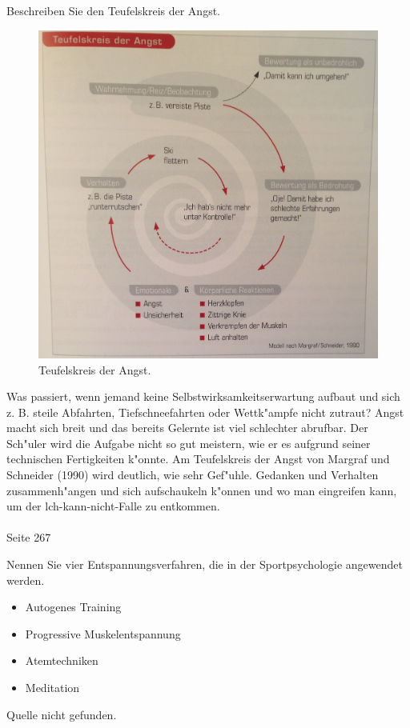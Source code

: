 \begin{question}{6}
Beschreiben Sie den Teufelskreis der Angst.
\end{question}
\begin{solution}
\begin{figure}[H]
  \centering
  \includegraphics[width=12cm]{pic/angst.jpg}
  \caption{Teufelskreis der Angst.}
  \label{fig:angst}
\end{figure}
Was passiert, wenn jemand keine Selbstwirksamkeitserwartung aufbaut und sich z. B. steile Abfahrten, Tiefschneefahrten oder Wettk"ampfe nicht zutraut? Angst macht sich breit und das bereits Gelernte ist viel schlechter abrufbar. Der Sch"uler wird die Aufgabe nicht so gut meistern, wie er es aufgrund seiner technischen Fertigkeiten k"onnte. Am Teufelskreis der Angst von Margraf und Schneider (1990) wird deutlich, wie sehr Gef"uhle. Gedanken und Verhalten zusammenh"angen und sich aufschaukeln k"onnen und wo man eingreifen kann, um der lch-kann-nicht-Falle zu entkommen.\\\\
 Seite 267
\end{solution}

\begin{question}{2}
Nennen Sie vier Entspannungsverfahren, die in der Sportpsychologie angewendet werden.
\end{question}
\begin{solution}
\begin{itemize}
\item Autogenes Training
\item Progressive Muskelentspannung
\item Atemtechniken
\item Meditation
\end{itemize}
Quelle nicht gefunden.
\end{solution}